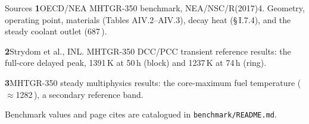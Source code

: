 \documentclass[aspectratio=169, 11pt, t]{beamer}
\begin{document}
\begin{frame}{Sources}
\vspace{10pt}
\small
{\color{RadBlue}\bfseries 1}\quad OECD/NEA MHTGR-350 benchmark, NEA/NSC/R(2017)4. Geometry, operating point, materials (Tables AIV.2--AIV.3), decay heat (\S\,I.7.4), and the steady coolant outlet (687\,\textcelsius).
\vspace{11pt}

{\color{RadBlue}\bfseries 2}\quad Strydom et al., INL. MHTGR-350 DCC/PCC transient reference results: the full-core delayed peak, 1391\,K at 50\,h (block) and 1237\,K at 74\,h (ring).
\vspace{11pt}

{\color{RadBlue}\bfseries 3}\quad MHTGR-350 steady multiphysics results: the core-maximum fuel temperature ($\approx$1282\,\textcelsius), a secondary reference band.
\vspace{16pt}

{\color{midGray}\footnotesize Benchmark values and page cites are catalogued in \texttt{benchmark/README.md}.}
\end{frame}
\end{document}
